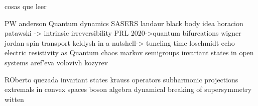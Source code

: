 cosas que leer

PW anderson Quantum dynamics
SASERS
landaur black body idea
horacion patawski -> intrinsic irreversibility PRL 2020->quantum bifurcations
wigner jordan spin transport
keldysh in a nutshell-> tuneling time
loschmidt echo
electric resistivity as Quantum chaos
markov semigroups
invariant states in open systems
aref'eva volovivh kozyrev 

ROberto quezada invariant states
krauss operators
subharmonic projections
extremals in convex spaces
boson algebra
dynamical breaking of supersymmetry witten